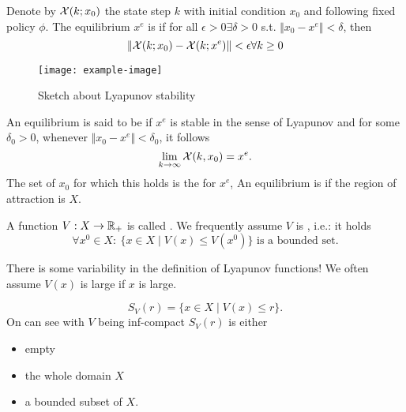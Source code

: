 \begin{definition}\label{def:1.5}
    Denote by \(\mathcal{X}(k;x_0)\) the state step \(k\) with initial condition \(x_0\) and following fixed policy \(\phi\).
    The equilibrium \(x^e\) is  if for all 
    \(\epsilon>0\exists \delta>0\) s.t. \(\Vert x_0-x^e\Vert < \delta\), then 
    \[\Vert \mathcal{X}(k;x_0)-\mathcal{X}(k;x^e)\Vert<\epsilon \forall k\geq 0\]
\end{definition}

\begin{figure}[H]\label{fig:1.05}
    \centering
    \texttt{[image: example-image]}
    \caption{Sketch about Lyapunov stability}
\end{figure}

\begin{definition}\label{def:1.6}
    An equilibrium is said to be  if 
    \(x^e\) is stable in the sense of Lyapunov and for some \(\delta_0>0\),
    whenever \(\Vert x_0-x^e\Vert<\delta_0\), it follows
    \[\lim_{k \to\infty} \mathcal{X}(k,x_0)=x^e.\]
    The set of \(x_0\) for which this holds is the  for 
    \(x^e\), An equilibrium is  if the region of attraction 
    is \(X\). 
\end{definition}


\begin{definition}\label{def:1.07}

    A function \(V:X\to \mathbb{R}_+\) is called . We frequently
    assume \(V\) is , i.e.: it holds 
    \[\forall x^0\in X:\ \{x\in X\mid V(x)\leq V(x^0)\}\text{ is a bounded set}.\]

\end{definition}

\begin{remark}
    There is some variability in the definition of Lyapunov functions! We often assume \(V(x)\) is large if \(x\) is large.
\end{remark}

 \[S_V(r)=\{x\in X \mid V(x)\leq r\}.\]
On can see with \(V\) being inf-compact \(S_V(r)\) is either
\begin{itemize}
    \item empty
    \item the whole domain \(X\) 
    \item a bounded subset of \(X\). 
\end{itemize}

